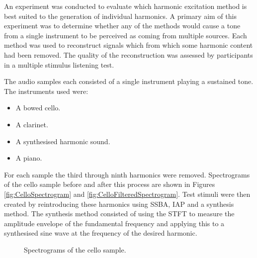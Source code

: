 		An experiment was conducted to evaluate which harmonic excitation method is best suited to the generation
		of individual harmonics. A primary aim of this experiment was to determine whether any of the methods would
		cause a tone from a single instrument to be perceived as coming from multiple sources. Each method was used
		to reconstruct signals which from which some harmonic content had been removed. The quality of the
		reconstruction was assessed by participants in a multiple stimulus listening test. 

		The audio samples each consisted of a single instrument playing a sustained tone. The instruments used
		were:
		
		\begin{itemize}
			\item A bowed cello.
			\item A clarinet.
			\item A synthesised harmonic sound.
			\item A piano.
		\end{itemize}

		For each sample the third through ninth harmonics were removed. Spectrograms of the cello sample before and
		after this process are shown in Figures \ref{fig:CelloSpectrogram} and \ref{fig:CelloFilteredSpectrogram}.
		Test stimuli were then created by reintroducing these harmonics using SSBA, IAP and a synthesis method.
		The synthesis method consisted of using the STFT to measure the amplitude envelope of the fundamental
		frequency and applying this to a synthesised sine wave at the frequency of the desired harmonic. 

		\begin{figure}[h!]
			\centering
			\qquad
			\caption{Spectrograms of the cello sample.}
			\label{fig:CelloSpectrograms}
		\end{figure}

